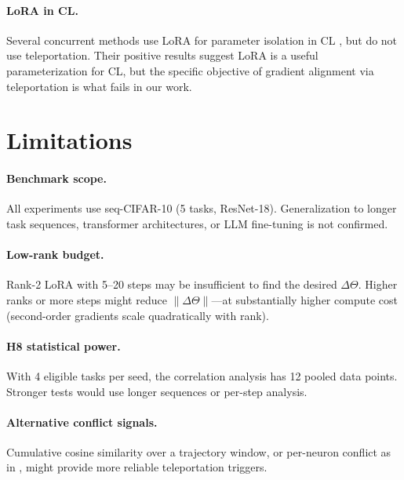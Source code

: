 \documentclass{article}
\begin{document}
\paragraph{LoRA in CL.}
Several concurrent methods use LoRA for parameter isolation in CL
\cite{PLACEHOLDER_treelora, PLACEHOLDER_keeplora}, but do not use teleportation.
Their positive results suggest LoRA is a useful parameterization for CL,
but the specific objective of gradient alignment via teleportation is what fails in our work.

\section{Limitations}
\label{sec:limitations}

\paragraph{Benchmark scope.}
All experiments use seq-CIFAR-10 (5 tasks, ResNet-18).
Generalization to longer task sequences, transformer architectures, or LLM fine-tuning is not confirmed.

\paragraph{Low-rank budget.}
Rank-2 LoRA with 5--20 steps may be insufficient to find the desired $\Delta\Theta$.
Higher ranks or more steps might reduce $\|\Delta\Theta\|$---at substantially higher compute cost
(second-order gradients scale quadratically with rank).

\paragraph{H8 statistical power.}
With 4 eligible tasks per seed, the correlation analysis has 12 pooled data points.
Stronger tests would use longer sequences or per-step analysis.

\paragraph{Alternative conflict signals.}
Cumulative cosine similarity over a trajectory window, or per-neuron conflict
as in \citet{liu2026gradconflict}, might provide more reliable teleportation triggers.

\end{document}
